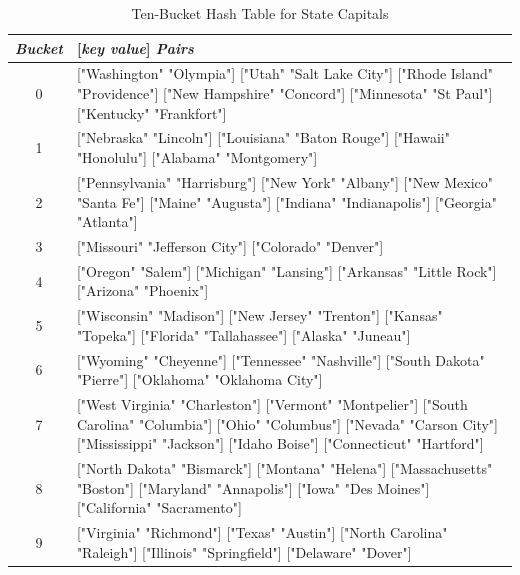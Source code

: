 \begin{table}
\begin{center}
\begin{tabular}{c|p{4in}}
\emph{Bucket} & \textsf{[}\emph{key value}\textsf{]} \emph{Pairs} \\
\hline
0 & \textsf{["Washington" "Olympia"]  ["Utah"  "Salt Lake City"]}  \hfill\break
\textsf{["Rhode Island"  "Providence"]  ["New Hampshire"  "Concord"]}  \hfill\break
\textsf{["Minnesota"  "St Paul"]  ["Kentucky"  "Frankfort"]} \\
\hline
1 & \textsf{["Nebraska"  "Lincoln"] ["Louisiana"  "Baton Rouge"]} \hfill\break
\textsf{["Hawaii"  "Honolulu"]  ["Alabama"  "Montgomery"]} \\
\hline
2 & \textsf{["Pennsylvania"  "Harrisburg"]  ["New York" "Albany"]} \hfill\break
\textsf{["New Mexico"  "Santa Fe"]  ["Maine"  "Augusta"]} \hfill\break
\textsf{["Indiana"  "Indianapolis"]  ["Georgia"  "Atlanta"]} \\
\hline
3 & \textsf{["Missouri"  "Jefferson City"]  ["Colorado"  "Denver"]} \\
\hline
4 & \textsf{["Oregon"  "Salem"]  ["Michigan"  "Lansing"]} \hfill\break
\textsf{["Arkansas"  "Little Rock"]  ["Arizona"  "Phoenix"]} \\
\hline
5 & \textsf{["Wisconsin" "Madison"]  ["New Jersey"  "Trenton"]} \hfill\break
\textsf{["Kansas"  "Topeka"]  ["Florida"  "Tallahassee"]} \hfill\break
\textsf{["Alaska"  "Juneau"]} \\
\hline
6 & \textsf{["Wyoming"  "Cheyenne"]  ["Tennessee"  "Nashville"]} \hfill\break
\textsf{["South Dakota"  "Pierre"]  ["Oklahoma"  "Oklahoma City"]} \\
\hline
7 & \textsf{["West Virginia"  "Charleston"]  ["Vermont"  "Montpelier"]} \hfill\break
\textsf{["South Carolina"  "Columbia"]  ["Ohio"  "Columbus"]} \hfill\break
\textsf{["Nevada"  "Carson City"]  ["Mississippi"  "Jackson"]} \hfill\break
\textsf{["Idaho  Boise"]  ["Connecticut"  "Hartford"]} \\
\hline
8 & \textsf{["North Dakota"  "Bismarck"]  ["Montana"  "Helena"]} \hfill\break
\textsf{["Massachusetts"  "Boston"]  ["Maryland"  "Annapolis"]} \hfill\break
\textsf{["Iowa" "Des Moines"]  ["California"  "Sacramento"]} \\
\hline
9 & \textsf{["Virginia"  "Richmond"]  ["Texas" "Austin"]} \hfill\break
\textsf{["North Carolina" "Raleigh"]  ["Illinois"  "Springfield"]} \hfill\break
\textsf{["Delaware"  "Dover"]} \\
\end{tabular}
\end{center}
\caption{Ten-Bucket Hash Table for State Capitals}
\label{table:hash-table-state-capitals}
\end{table}

